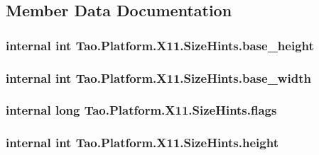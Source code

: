 \subsection{Member Data Documentation}
\hypertarget{struct_tao_1_1_platform_1_1_x11_1_1_size_hints_af2159998ac63d1ed32b746320885198b}{
\subsubsection[{base\_\-height}]{\setlength{\rightskip}{0pt plus 5cm}internal int {\bf Tao.Platform.X11.SizeHints.base\_\-height}}}
\label{struct_tao_1_1_platform_1_1_x11_1_1_size_hints_af2159998ac63d1ed32b746320885198b}
\hypertarget{struct_tao_1_1_platform_1_1_x11_1_1_size_hints_a670237843d16b49404642f9fd61c6788}{
\subsubsection[{base\_\-width}]{\setlength{\rightskip}{0pt plus 5cm}internal int {\bf Tao.Platform.X11.SizeHints.base\_\-width}}}
\label{struct_tao_1_1_platform_1_1_x11_1_1_size_hints_a670237843d16b49404642f9fd61c6788}
\hypertarget{struct_tao_1_1_platform_1_1_x11_1_1_size_hints_a95a35d4586744d9a62431ec5e273e61f}{
\subsubsection[{flags}]{\setlength{\rightskip}{0pt plus 5cm}internal long {\bf Tao.Platform.X11.SizeHints.flags}}}
\label{struct_tao_1_1_platform_1_1_x11_1_1_size_hints_a95a35d4586744d9a62431ec5e273e61f}
\hypertarget{struct_tao_1_1_platform_1_1_x11_1_1_size_hints_a2a7336e5bae01b3fb5280b55fdf615f5}{
\subsubsection[{height}]{\setlength{\rightskip}{0pt plus 5cm}internal int {\bf Tao.Platform.X11.SizeHints.height}}}
